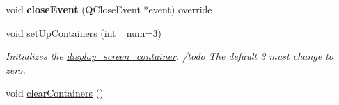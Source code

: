 \begin{DoxyCompactItemize}
\item 
\mbox{\label{classScreen__manager_a1e77461fc2c621a338131d25efa28e7a}} 
void {\bfseries close\+Event} (Q\+Close\+Event $\ast$event) override
\item 
\mbox{\label{classScreen__manager_ae999da71a66db6ce0ce62216fe20863a}} 
void \mbox{\hyperlink{classScreen__manager_ae999da71a66db6ce0ce62216fe20863a}{set\+Up\+Containers}} (int \+\_\+num=3)
\begin{DoxyCompactList}\small\item\em Initializes the \mbox{\hyperlink{classdisplay__screen__container}{display\+\_\+screen\+\_\+container}}. /todo The default 3 must change to zero. \end{DoxyCompactList}\item 
void \mbox{\hyperlink{classScreen__manager_a5896c354d45b0b4142a76b26f7081787}{clear\+Containers}} ()
\end{DoxyCompactItemize}
